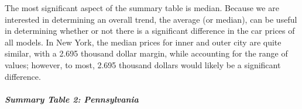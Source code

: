 \documentclass[
]{article}
\newenvironment{Shaded}{\begin{snugshade}}{\end{snugshade}}
\newcommand{\AttributeTok}[1]{\textcolor[rgb]{0.13,0.29,0.53}{#1}}
\newcommand{\CommentTok}[1]{\textcolor[rgb]{0.56,0.35,0.01}{\textit{#1}}}
\newcommand{\ConstantTok}[1]{\textcolor[rgb]{0.56,0.35,0.01}{#1}}
\newcommand{\DecValTok}[1]{\textcolor[rgb]{0.00,0.00,0.81}{#1}}
\newcommand{\FloatTok}[1]{\textcolor[rgb]{0.00,0.00,0.81}{#1}}
\newcommand{\FunctionTok}[1]{\textcolor[rgb]{0.13,0.29,0.53}{\textbf{#1}}}
\newcommand{\NormalTok}[1]{#1}
\newcommand{\OtherTok}[1]{\textcolor[rgb]{0.56,0.35,0.01}{#1}}
\newcommand{\SpecialCharTok}[1]{\textcolor[rgb]{0.81,0.36,0.00}{\textbf{#1}}}
\newcommand{\StringTok}[1]{\textcolor[rgb]{0.31,0.60,0.02}{#1}}
\begin{document}
The most significant aspect of the summary table is median. Because we
are interested in determining an overall trend, the average (or median),
can be useful in determining whether or not there is a significant
difference in the car prices of all models. In New York, the median
prices for inner and outer city are quite similar, with a 2.695 thousand
dollar margin, while accounting for the range of values; however, to
most, 2.695 thousand dollars would likely be a significant difference.

\hypertarget{summary-table-2-pennsylvania}{%
\subparagraph{Summary Table 2:
Pennsylvania}\label{summary-table-2-pennsylvania}}

\begin{Shaded}
\end{Shaded}
\end{document}
